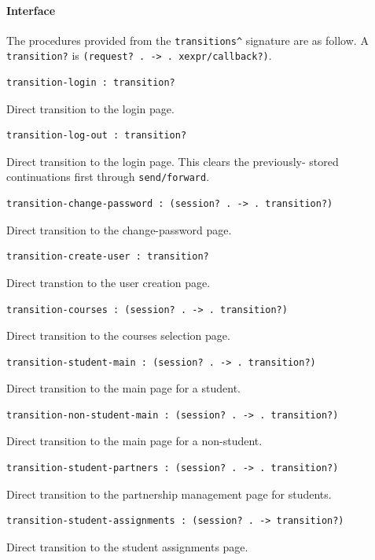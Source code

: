 \documentclass[a4paper]{article}
\begin{document}
\paragraph{Interface}\label{para:transitions-interface}

The procedures provided from the \verb|transitions^| signature are as follow.
A \verb|transition?| is \verb|(request? . -> . xexpr/callback?)|.

\begin{verbatim}
transition-login : transition?
\end{verbatim}
Direct transition to the login page.

\begin{verbatim}
transition-log-out : transition?
\end{verbatim}
Direct transition to the login page. This clears the previously-
stored continuations first through \verb|send/forward|.

\begin{verbatim}
transition-change-password : (session? . -> . transition?)
\end{verbatim}
Direct transition to the change-password page.

\begin{verbatim}
transition-create-user : transition?
\end{verbatim}
Direct transtion to the user creation page.

\begin{verbatim}
transition-courses : (session? . -> . transition?)
\end{verbatim}
Direct transition to the courses selection page.

\begin{verbatim}
transition-student-main : (session? . -> . transition?)
\end{verbatim}
Direct transition to the main page for a student.

\begin{verbatim}
transition-non-student-main : (session? . -> . transition?)
\end{verbatim}
Direct transition to the main page for a non-student.

\begin{verbatim}
transition-student-partners : (session? . -> . transition?)
\end{verbatim}
Direct transition to the partnership management page for students.

\begin{verbatim}
transition-student-assignments : (session? . -> transition?)
\end{verbatim}
Direct transition to the student assignments page.
\end{document}
